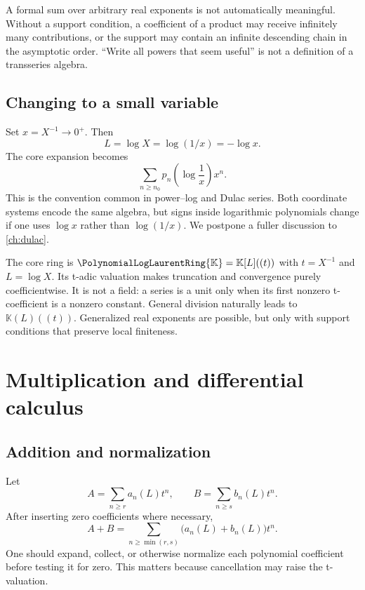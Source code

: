 \documentclass[11pt,openany]{book}
\theoremstyle{definition}
\theoremstyle{plain}
\theoremstyle{remark}
\newcommand{\K}{\mathbb{K}}
\begin{document}
\begin{warningbox}
A formal sum over arbitrary real exponents is not automatically meaningful.
Without a support condition, a coefficient of a product may receive infinitely
many contributions, or the support may contain an infinite descending chain in
the asymptotic order.  ``Write all powers that seem useful'' is not a
definition of a transseries algebra.
\end{warningbox}

\section{Changing to a small variable}
Set \(x=X^{-1}\to0^+\).  Then
\[
 L=\log X=\log(1/x)=-\log x.
\]
The core expansion becomes
\begin{equation}\label{eq:small-variable-form}
 \sum_{n\ge n_0}p_n\!\left(\log\frac1x\right)x^n.
\end{equation}
This is the convention common in power--log and Dulac series.  Both coordinate
systems encode the same algebra, but signs inside logarithmic polynomials
change if one uses \(\log x\) rather than \(\log(1/x)\).  We postpone a fuller
discussion to \cref{ch:dulac}.

\begin{summarybox}
The core ring is \(\PolynomialLogLaurentRing{\K}=\K[L]((t))\) with \(t=X^{-1}\) and
\(L=\log X\).  Its t-adic valuation makes truncation and convergence purely
coefficientwise.  It is not a field: a series is a unit only when its first
nonzero t-coefficient is a nonzero constant.  General division naturally leads
to \(\K(L)((t))\).  Generalized real exponents are possible, but only with
support conditions that preserve local finiteness.
\end{summarybox}

\chapter{Multiplication and differential calculus}\label{ch:multiplication}

\section{Addition and normalization}
Let
\[
 A=\sum_{n\ge r}a_n(L)t^n,
 \qquad
 B=\sum_{n\ge s}b_n(L)t^n.
\]
After inserting zero coefficients where necessary,
\[
 A+B=\sum_{n\ge\min(r,s)}\bigl(a_n(L)+b_n(L)\bigr)t^n.
\]
One should expand, collect, or otherwise normalize each polynomial coefficient
before testing it for zero.  This matters because cancellation may raise the
t-valuation.
\end{document}
